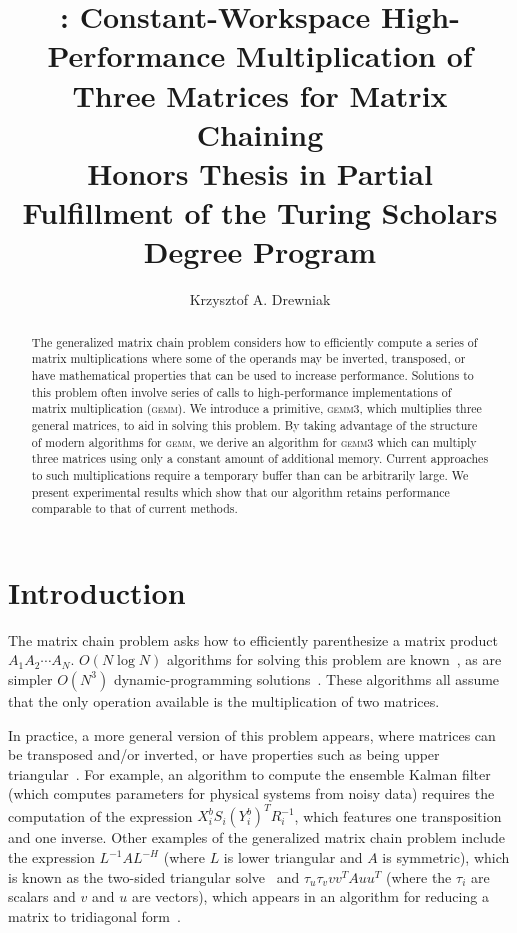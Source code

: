\documentclass[12pt]{article}
\title{\gemmt{}: Constant-Workspace High-Performance Multiplication of Three Matrices for Matrix Chaining\\
{\large Honors Thesis in Partial Fulfillment of the Turing Scholars Degree Program}}
\author{Krzysztof A. Drewniak}
\newcommand*{\gemmt}{{\textsc{gemm3}}}
\newcommand*{\gemm}{{\textsc{gemm}}}
\newcommand*{\mycite}[1]{~\cite{#1}}
\begin{document}
\maketitle{}
\begin{abstract}
  The generalized matrix chain problem considers how to efficiently compute a series of matrix multiplications where some of the operands may be inverted, transposed, or have mathematical properties that can be used to increase performance.
  Solutions to this problem often involve series of calls to high-performance implementations of matrix multiplication (\gemm{}).
  We introduce a primitive, \gemmt{}, which multiplies three general matrices, to aid in solving this problem.
  By taking advantage of the structure of modern algorithms for \gemm{}, we derive an algorithm for \gemmt{} which can multiply three matrices using only a constant amount of additional memory.
  Current approaches to such multiplications require a temporary buffer than can be arbitrarily large.
  We present experimental results which show that our algorithm retains performance comparable to that of current methods.
\end{abstract}

\section{Introduction}
The matrix chain problem asks how to efficiently parenthesize a matrix product $A_1A_2\cdots A_N$.
$O(N \log N)$ algorithms for solving this problem are known\mycite{Hu1984}, as are simpler $O(N^3)$ dynamic-programming solutions\mycite{Barthels2018}.
These algorithms all assume that the only operation available is the multiplication of two matrices.

In practice, a more general version of this problem appears, where matrices can be transposed and/or inverted, or have properties such as being upper triangular\mycite{Barthels2018}.
For example, an algorithm to compute the ensemble Kalman filter\mycite{Rao2017} (which computes parameters for physical systems from noisy data) requires the computation of the expression $X_i^b S_i (Y_i^b)^T R_i^{-1}$, which features one transposition and one inverse.
Other examples of the generalized matrix chain problem include the expression $L^{-1}AL^{-H}$ (where $L$ is lower triangular and $A$ is symmetric), which is known as the two-sided triangular solve\mycite{Poulson2011} and $\tau_u\tau_v vv^TAuu^T$ (where the $\tau_i$ are scalars and $v$ and $u$ are vectors), which appears in an algorithm for reducing a matrix to tridiagonal form\mycite{Choi1995}.
\end{document}
